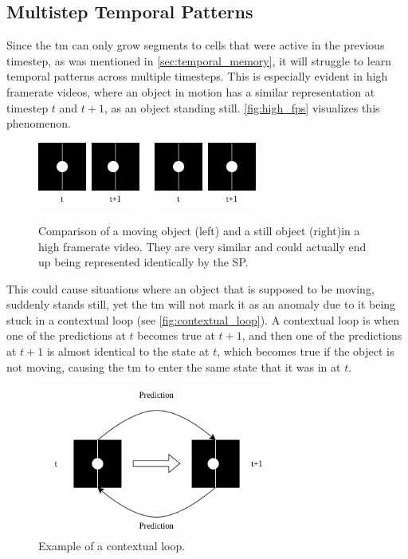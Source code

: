 \subsection{Multistep Temporal Patterns}
\label{sec:multistep_temporal_patterns}
Since the \gls*{tm} can only grow segments to cells that were active in the previous timestep, as was mentioned in \autoref{sec:temporal_memory}, it will struggle to learn temporal patterns across multiple timesteps. This is especially evident in high framerate videos, where an object in motion has a similar representation at timestep $t$ and $t+1$, as an object standing still. \autoref{fig:high_fps} visualizes this phenomenon.
\begin{figure}[H]
    \centering
    \includegraphics[width=0.3\textwidth]{resources/methodology/high_fps_moving.png}
    \unskip\ \vrule\
    \includegraphics[width=0.3\textwidth]{resources/methodology/high_fps_still.png}
    \caption[Comparison of a Moving Object in a High Framerate Video]{Comparison of a moving object (left) and a still object (right)in a high framerate video. They are very similar and could actually end up being represented identically by the SP.}
    \label{fig:high_fps}
\end{figure}
This could cause situations where an object that is supposed to be moving, suddenly stands still, yet the \gls*{tm} will not mark it as an anomaly due to it being stuck in a contextual loop (see \autoref{fig:contextual_loop}). A contextual loop is when one of the predictions at $t$ becomes true at $t+1$, and then one of the predictions at $t+1$ is almost identical to the state at $t$, which becomes true if the object is not moving, causing the \gls*{tm} to enter the same state that it was in at $t$.
\begin{figure}[H]
    \centering
    \includegraphics[width=0.7\textwidth]{resources/methodology/contextual_loop.png}
    \caption[Contextual Loop Example]{Example of a contextual loop.}
    \label{fig:contextual_loop}
\end{figure}
